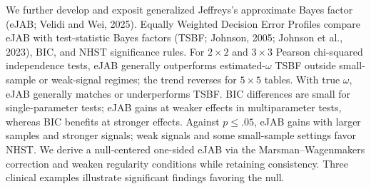 We further develop and exposit generalized Jeffreys's approximate Bayes
factor (eJAB; Velidi and Wei, 2025). Equally Weighted Decision Error
Profiles compare eJAB with test-statistic Bayes factors (TSBF; Johnson,
2005; Johnson et al., 2023), BIC, and NHST significance rules.
For \(2\times2\) and \(3\times3\) Pearson chi-squared independence tests,
eJAB generally outperforms estimated-\(\omega\) TSBF outside small-sample
or weak-signal regimes; the trend reverses for \(5\times5\) tables.
With true \(\omega\), eJAB generally matches or underperforms TSBF.
BIC differences are small for single-parameter tests; eJAB gains at
weaker effects in multiparameter tests, whereas BIC benefits at stronger
effects. Against \(p\leq.05\), eJAB gains with larger samples and stronger
signals; weak signals and some small-sample settings favor NHST.
We derive a null-centered one-sided eJAB via the Marsman--Wagenmakers
correction and weaken regularity conditions while retaining consistency.
Three clinical examples illustrate significant findings favoring the null.
